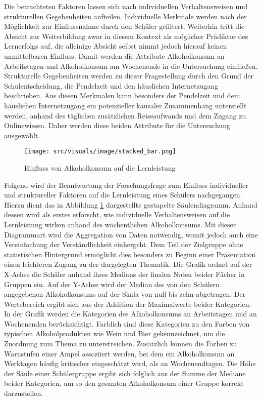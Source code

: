 Die betrachteten Faktoren lassen sich nach individuellen Verhaltensweisen und strukturellen Gegebenheiten aufteilen.
Individuelle Merkmale werden nach der Möglichkeit zur Einflussnahme durch den Schüler gefiltert.
Weiterhin tritt die Absicht zur Weiterbildung zwar in diesem Kontext als möglicher Prädiktor des Lernerfolgs auf, die alleinige Absicht selbst nimmt jedoch hierauf keinen unmittelbaren Einfluss.
Damit werden die Attribute Alkoholkonsum an Arbeitstagen und Alkoholkonsum am Wochenende in die Untersuchung einfließen.
Strukturelle Gegebenheiten werden zu dieser Fragestellung durch den Grund der Schulentscheidung, die Pendelzeit und den häuslichen Internetzugang beschrieben.
Aus diesen Merkmalen kann besonders der Pendelzeit und dem häuslichen Internetzugang ein potenzieller kausaler Zusammenhang unterstellt werden, anhand des täglichen zusätzlichen Reiseaufwands und dem Zugang zu Onlinewissen.
Daher werden diese beiden Attribute für die Untersuchung ausgewählt.

\clearpage
\begin{figure}[htb]
    \centering
    \texttt{[image: src/visuals/image/stacked\_bar.png]}
    \caption{Einfluss von Alkoholkonsum auf die Lernleistung}
    \label{fig:stacked_bar}
\end{figure}

Folgend wird der Beantwortung der Forschungsfrage zum Einfluss individueller und struktureller Faktoren auf die Lernleistung eines Schülers nachgegangen. 
Hierzu dient das in Abbildung \ref{fig:stacked_bar} dargestellte gestapelte Säulendiagramm.
Anhand dessen wird als erstes erforscht, wie individuelle Verhaltensweisen auf die Lernleistung wirken anhand des wöchentlichen Alkoholkonsums.
Mit dieser Diagrammart wird die Aggregation von Daten notwendig, womit jedoch auch eine Vereinfachung der Verständlichkeit einhergeht.
Dem Teil der Zielgruppe ohne statistischen Hintergrund ermöglicht dies besonders zu Beginn einer Präsentation einen leichteren Zugang zu der dargelegten Thematik.
Die Grafik ordnet auf der X-Achse die Schüler anhand ihres Medians der finalen Noten beider Fächer in Gruppen ein.
Auf der Y-Achse wird der Median des von den Schülern angegebenen Alkoholkonsums auf der Skala von null bis zehn abgetragen.
Der Wertebereich ergibt sich aus der Addition der Maximalwerte beider Kategorien.
In der Grafik werden die Kategorien des Alkoholkonsums an Arbeitstagen und an Wochenenden berücksichtigt.
Farblich sind diese Kategorien zu den Farben von typischen Alkoholprodukten wie Wein und Bier gekennzeichnet, um die Zuordnung zum Thema zu unterstreichen.
Zusätzlich können die Farben zu Warnstufen einer Ampel assoziiert werden, bei dem ein Alkoholkonsum an Werktagen häufig kritischer eingeschätzt wird, als an Wochenendtagen.
Die Höhe der Säule einer Schülergruppe ergibt sich folglich aus der Summe der Mediane beider Kategorien, um so den gesamten Alkoholkonsum einer Gruppe korrekt darzustellen.

